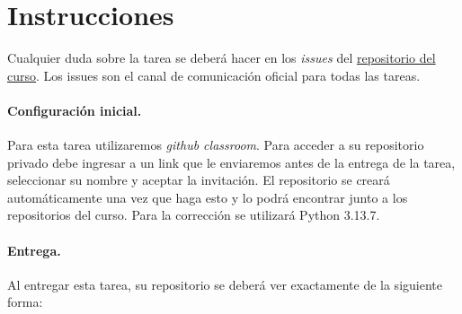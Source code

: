 
\section*{Instrucciones}

Cualquier duda sobre la tarea se deberá hacer en los \emph{issues} del \href{https://github.com/IIC3253/2026}{repositorio del curso}. Los issues son el canal de comunicación oficial para todas las tareas.

\paragraph{Configuración inicial.} 
Para esta tarea utilizaremos \textit{github classroom}. 
Para acceder a su repositorio privado debe ingresar a un link que le enviaremos antes de la entrega de la tarea, seleccionar su nombre y aceptar la invitación.
El repositorio se creará automáticamente una vez que haga esto y lo podrá encontrar junto a los repositorios del curso.
Para la corrección se utilizará Python 3.13.7.

\paragraph{Entrega.} Al entregar esta tarea, su repositorio se deberá ver exactamente de la siguiente forma:

\bigskip



